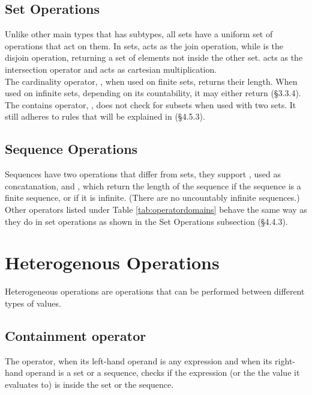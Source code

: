 \documentclass[11pt,a4paper]{book}
\begin{document}
\subsection{Set Operations}

Unlike other main types that has subtypes, all sets have a uniform set of operations that act on them. In sets, \code{+} acts as the join operation, while \code{-} is the disjoin operation, returning a set of elements not inside the other set. \code{\&} acts as the intersection operator and \code{*} acts as cartesian multiplication. \\

The cardinality operator, \code{||}, when used on finite sets, returns their length. When used on infinite sets, depending on its countability, it may either return   (\S 3.3.4). \\

The contains operator, , does not check for subsets when used with two sets. It still adheres to rules that will be explained in (\S4.5.3).

\subsection{Sequence Operations}

Sequences have two operations that differ from sets, they support \code{+}, used as concatanation, and \code{||}, which return the length of the sequence if the sequence is a finite sequence, or  if it is infinite. (There are no uncountably infinite sequences.) \\

Other operators listed under Table \ref{tab:operatordomains} behave the same way as they do in set operations as shown in the Set Operations subsection (\S 4.4.3).

\section{Heterogenous Operations}

Heterogeneous operations are operations that can be performed between different types of values.

\subsection{Containment operator }

The  operator, when its left-hand operand is any expression and when its right-hand operand is a set or a sequence, checks if the expression (or the the value it evaluates to) is inside the set or the sequence.
\end{document}
